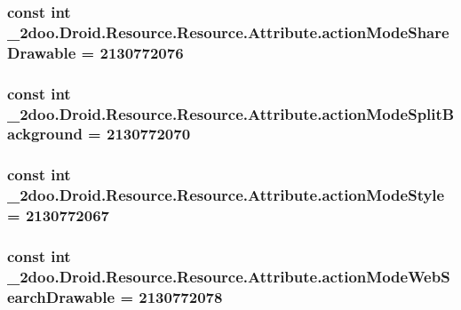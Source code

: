 \hypertarget{class__2doo_1_1_droid_1_1_resource_1_1_attribute_cd007809c7815bfe0883ac9fa757de2f}{
\subsubsection[{actionModeShareDrawable}]{\setlength{\rightskip}{0pt plus 5cm}const int \_\-2doo.Droid.Resource.Resource.Attribute.actionModeShareDrawable = 2130772076}}
\label{class__2doo_1_1_droid_1_1_resource_1_1_attribute_cd007809c7815bfe0883ac9fa757de2f}


\hypertarget{class__2doo_1_1_droid_1_1_resource_1_1_attribute_64cfc2d1ea9f4c3f663576bd4e1627d4}{
\subsubsection[{actionModeSplitBackground}]{\setlength{\rightskip}{0pt plus 5cm}const int \_\-2doo.Droid.Resource.Resource.Attribute.actionModeSplitBackground = 2130772070}}
\label{class__2doo_1_1_droid_1_1_resource_1_1_attribute_64cfc2d1ea9f4c3f663576bd4e1627d4}


\hypertarget{class__2doo_1_1_droid_1_1_resource_1_1_attribute_14d2c7eb2ba42b74a8c319287c99586b}{
\subsubsection[{actionModeStyle}]{\setlength{\rightskip}{0pt plus 5cm}const int \_\-2doo.Droid.Resource.Resource.Attribute.actionModeStyle = 2130772067}}
\label{class__2doo_1_1_droid_1_1_resource_1_1_attribute_14d2c7eb2ba42b74a8c319287c99586b}


\hypertarget{class__2doo_1_1_droid_1_1_resource_1_1_attribute_da2c895106a068c211f06c32de13f67a}{
\subsubsection[{actionModeWebSearchDrawable}]{\setlength{\rightskip}{0pt plus 5cm}const int \_\-2doo.Droid.Resource.Resource.Attribute.actionModeWebSearchDrawable = 2130772078}}
\label{class__2doo_1_1_droid_1_1_resource_1_1_attribute_da2c895106a068c211f06c32de13f67a}


